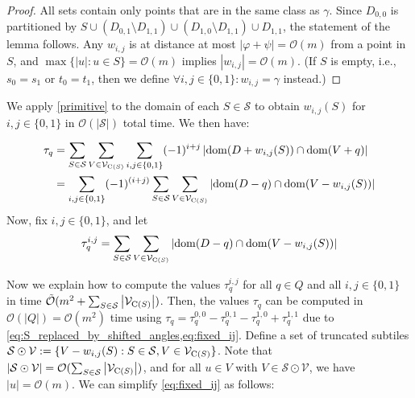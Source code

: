 \documentclass[twoside,leqno]{article}
\let\Cref\cref
\renewcommand{\O}{\mathcal{O}}
\newcommand{\tO}{\tilde{\mathcal{O}}}
\renewcommand{\S}{\mathcal{S}}
\newcommand{\V}{\mathcal{V}}
\renewcommand{\phi}{\varphi}
\newcommand{\absolute}[1]{\left\lvert#1\right\rvert}
\begin{document}
\begin{lemma}
\begin{proof}
\vspace{.5\baselineskip}

All sets contain only points that are in the same class as $\gamma$. 
Since $D_{0,0}$ is partitioned by $S \cup (D_{0, 1}\setminus D_{1, 1}) \cup (D_{1, 0}\setminus D_{1, 1}) \cup D_{1, 1}$, the statement of the lemma follows. 
Any $w_{i, j}$ is at distance at most $\absolute{\phi + \psi} = \O(m)$ from a point in $S$, and $\max \{\absolute{u} : u \in S\} = \O(m)$ implies $\absolute{w_{i,j}} = \O(m)$. 
(If $S$ is empty, i.e., $s_0 = s_1$ or $t_0 = t_1$, then we define $\forall i,j\in\{0, 1\} : w_{i,j} = \gamma$ instead.)
\end{proof}

\end{lemma}


We apply \Cref{primitive} to the domain of each $S\in \S$ to obtain $w_{i, j}(S)$ for $i,j \in \{0,1\}$ in $\O(\absolute{\S})$ total time. We then have:

\begin{align}
\label{eq:S_replaced_by_shifted_angles}
\begin{split}
\tau_q &= \sum_{S \in \S} \sum_{V \in \V_{\getchar{S}}} \sum_{i,j \in \{0,1\}} (-1)^{i+j} \absolute{\d{D+w_{i, j}(S)} \cap \d{V + q}} \\
& = \sum_{i,j \in \{0,1\}} (-1)^{(i+j)} \sum_{S \in \S} \sum_{V \in \V_{\getchar{S}}} \absolute{\d{D-q} \cap \d{V-w_{i, j}(S)}}
\end{split}
\end{align}
%
Now, fix $i,j \in \{0,1\}$, and let 
%
\begin{equation}
\label{eq:fixed_ij}
\tau_q^{i,j} = \sum_{S \in \S} \sum_{V \in \V_{\getchar{S}}} \absolute{\d{D-q} \cap \d{V-w_{i, j}(S)}}
\end{equation}

Now we explain how to compute the values $\tau_q^{i,j}$ for all $q \in Q$ and all $i,j \in \{0,1\}$ in time $\tO(m^2 + \sum_{S \in \S} \absolute{\V_{\getchar{S}}})$. Then, the values $\tau_q$ can be computed in $\O(\absolute{Q}) = \O(m^2)$ time using $\tau_q = \tau^{0,0}_q - \tau^{0,1}_q - \tau^{1,0}_q + \tau^{1,1}_q$ due to \cref{eq:S_replaced_by_shifted_angles,eq:fixed_ij}. 
Define a set of truncated subtiles $\S \odot \V := \{V-w_{i, j}(S) : S \in \S, V \in \V_{\getchar{S}}\}$.  Note that $\absolute{\S \odot \V} = \O(\sum_{S \in \S} \absolute{\V_{\getchar{S}}})$, and for all $u \in V$ with $V \in \S \odot \V$, we have $\absolute{u} = \O(m)$. We can simplify \cref{eq:fixed_ij} as follows:
\end{document}
